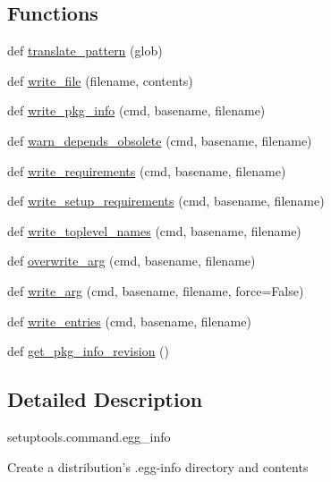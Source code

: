 \subsection*{Functions}
\begin{DoxyCompactItemize}
\item 
def \hyperlink{namespacesetuptools_1_1command_1_1egg__info_aa144258099051fcc4002b9750d064587}{translate\+\_\+pattern} (glob)
\item 
def \hyperlink{namespacesetuptools_1_1command_1_1egg__info_a3f7abc3fba29e56b617aa9b520a4ec92}{write\+\_\+file} (filename, contents)
\item 
def \hyperlink{namespacesetuptools_1_1command_1_1egg__info_ab2a1d559ee9ac96e67be5107f4f1e326}{write\+\_\+pkg\+\_\+info} (cmd, basename, filename)
\item 
def \hyperlink{namespacesetuptools_1_1command_1_1egg__info_a8328fab813b7049a7850641b991f06f4}{warn\+\_\+depends\+\_\+obsolete} (cmd, basename, filename)
\item 
def \hyperlink{namespacesetuptools_1_1command_1_1egg__info_aa61f1a6ac6acab068d1bb5636d0518dc}{write\+\_\+requirements} (cmd, basename, filename)
\item 
def \hyperlink{namespacesetuptools_1_1command_1_1egg__info_ab882835b091bf0f8ebfa2a5aab386681}{write\+\_\+setup\+\_\+requirements} (cmd, basename, filename)
\item 
def \hyperlink{namespacesetuptools_1_1command_1_1egg__info_ac21207e4cdc389c274f78ba07d6827bc}{write\+\_\+toplevel\+\_\+names} (cmd, basename, filename)
\item 
def \hyperlink{namespacesetuptools_1_1command_1_1egg__info_ada555a3b6131089b7a4d6a29c41350b6}{overwrite\+\_\+arg} (cmd, basename, filename)
\item 
def \hyperlink{namespacesetuptools_1_1command_1_1egg__info_a25f4fcbcc6aaa9f956521ad1aa5c66a3}{write\+\_\+arg} (cmd, basename, filename, force=False)
\item 
def \hyperlink{namespacesetuptools_1_1command_1_1egg__info_a793b9c5d75faf66badb7729625f988a0}{write\+\_\+entries} (cmd, basename, filename)
\item 
def \hyperlink{namespacesetuptools_1_1command_1_1egg__info_ac6d4da2fc87ba11bb3042e35ae77c7ed}{get\+\_\+pkg\+\_\+info\+\_\+revision} ()
\end{DoxyCompactItemize}


\subsection{Detailed Description}
\begin{DoxyVerb}setuptools.command.egg_info

Create a distribution's .egg-info directory and contents\end{DoxyVerb}
 

